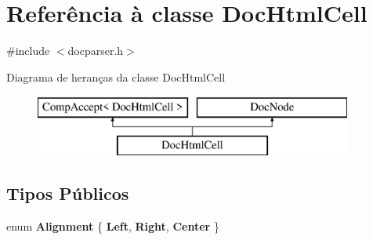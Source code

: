 \hypertarget{class_doc_html_cell}{\section{Referência à classe Doc\-Html\-Cell}
\label{class_doc_html_cell}
}


{\ttfamily \#include $<$docparser.\-h$>$}

Diagrama de heranças da classe Doc\-Html\-Cell\begin{figure}[H]
\begin{center}
\leavevmode
\includegraphics[height=2.000000cm]{class_doc_html_cell}
\end{center}
\end{figure}
\subsection*{Tipos Públicos}
\begin{DoxyCompactItemize}
\item 
enum {\bfseries Alignment} \{ {\bfseries Left}, 
{\bfseries Right}, 
{\bfseries Center}
 \}
\end{DoxyCompactItemize}
